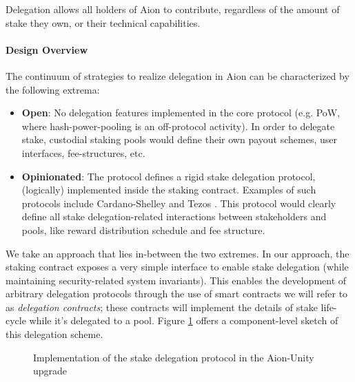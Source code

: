 Delegation allows all holders of Aion to contribute, regardless of the amount of stake they own, or their technical capabilities.

\paragraph{Design Overview}
The continuum of strategies to realize delegation in Aion can be characterized by the following extrema:
\begin{itemize}
    \item \textbf{Open}: No delegation features implemented in the core protocol (e.g. PoW, where hash-power-pooling is an off-protocol activity). In order to delegate stake, custodial staking pools would define their own payout schemes, user interfaces, fee-structures, etc. 
    \item \textbf{Opinionated}: The protocol defines a rigid stake delegation protocol, (logically) implemented inside the staking contract. Examples of such protocols include Cardano-Shelley \cite{KBC19} and Tezos \cite{Goo14}. This protocol would clearly define all stake delegation-related interactions between stakeholders and pools, like reward distribution schedule and fee structure.   
\end{itemize}

We take an approach that lies in-between the two extremes. In our approach, the staking contract exposes a very simple interface to enable stake delegation (while maintaining security-related system invariants). This enables the development of arbitrary delegation protocols through the use of smart contracts we will refer to as \textit{delegation contracts}; these contracts will implement the details of stake life-cycle  while it's delegated to a pool. Figure \ref{fig:delegation_scheme} offers a component-level sketch of this delegation scheme. 

\begin{figure}[ht]
\centering
{}
\caption{Implementation of the stake delegation protocol in the Aion-Unity upgrade}
\label{fig:delegation_scheme}
\end{figure}

